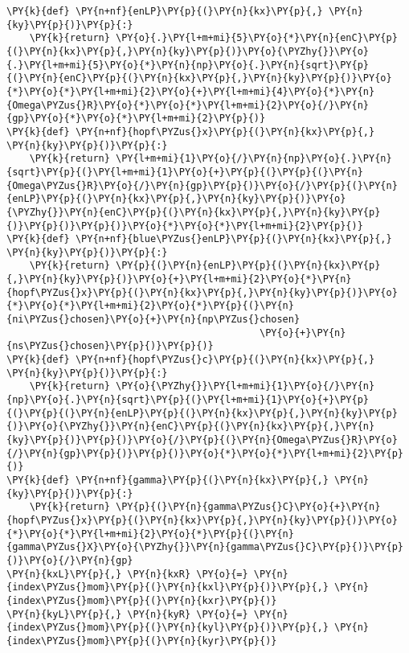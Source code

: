 \begin{Verbatim}[commandchars=\\\{\}]
\PY{k}{def} \PY{n+nf}{enLP}\PY{p}{(}\PY{n}{kx}\PY{p}{,} \PY{n}{ky}\PY{p}{)}\PY{p}{:}
    \PY{k}{return} \PY{o}{.}\PY{l+m+mi}{5}\PY{o}{*}\PY{n}{enC}\PY{p}{(}\PY{n}{kx}\PY{p}{,}\PY{n}{ky}\PY{p}{)}\PY{o}{\PYZhy{}}\PY{o}{.}\PY{l+m+mi}{5}\PY{o}{*}\PY{n}{np}\PY{o}{.}\PY{n}{sqrt}\PY{p}{(}\PY{n}{enC}\PY{p}{(}\PY{n}{kx}\PY{p}{,}\PY{n}{ky}\PY{p}{)}\PY{o}{*}\PY{o}{*}\PY{l+m+mi}{2}\PY{o}{+}\PY{l+m+mi}{4}\PY{o}{*}\PY{n}{Omega\PYZus{}R}\PY{o}{*}\PY{o}{*}\PY{l+m+mi}{2}\PY{o}{/}\PY{n}{gp}\PY{o}{*}\PY{o}{*}\PY{l+m+mi}{2}\PY{p}{)}
\PY{k}{def} \PY{n+nf}{hopf\PYZus{}x}\PY{p}{(}\PY{n}{kx}\PY{p}{,} \PY{n}{ky}\PY{p}{)}\PY{p}{:}
    \PY{k}{return} \PY{l+m+mi}{1}\PY{o}{/}\PY{n}{np}\PY{o}{.}\PY{n}{sqrt}\PY{p}{(}\PY{l+m+mi}{1}\PY{o}{+}\PY{p}{(}\PY{p}{(}\PY{n}{Omega\PYZus{}R}\PY{o}{/}\PY{n}{gp}\PY{p}{)}\PY{o}{/}\PY{p}{(}\PY{n}{enLP}\PY{p}{(}\PY{n}{kx}\PY{p}{,}\PY{n}{ky}\PY{p}{)}\PY{o}{\PYZhy{}}\PY{n}{enC}\PY{p}{(}\PY{n}{kx}\PY{p}{,}\PY{n}{ky}\PY{p}{)}\PY{p}{)}\PY{p}{)}\PY{o}{*}\PY{o}{*}\PY{l+m+mi}{2}\PY{p}{)}
\PY{k}{def} \PY{n+nf}{blue\PYZus{}enLP}\PY{p}{(}\PY{n}{kx}\PY{p}{,} \PY{n}{ky}\PY{p}{)}\PY{p}{:}
    \PY{k}{return} \PY{p}{(}\PY{n}{enLP}\PY{p}{(}\PY{n}{kx}\PY{p}{,}\PY{n}{ky}\PY{p}{)}\PY{o}{+}\PY{l+m+mi}{2}\PY{o}{*}\PY{n}{hopf\PYZus{}x}\PY{p}{(}\PY{n}{kx}\PY{p}{,}\PY{n}{ky}\PY{p}{)}\PY{o}{*}\PY{o}{*}\PY{l+m+mi}{2}\PY{o}{*}\PY{p}{(}\PY{n}{ni\PYZus{}chosen}\PY{o}{+}\PY{n}{np\PYZus{}chosen}
                                            \PY{o}{+}\PY{n}{ns\PYZus{}chosen}\PY{p}{)}\PY{p}{)}
\PY{k}{def} \PY{n+nf}{hopf\PYZus{}c}\PY{p}{(}\PY{n}{kx}\PY{p}{,} \PY{n}{ky}\PY{p}{)}\PY{p}{:}
    \PY{k}{return} \PY{o}{\PYZhy{}}\PY{l+m+mi}{1}\PY{o}{/}\PY{n}{np}\PY{o}{.}\PY{n}{sqrt}\PY{p}{(}\PY{l+m+mi}{1}\PY{o}{+}\PY{p}{(}\PY{p}{(}\PY{n}{enLP}\PY{p}{(}\PY{n}{kx}\PY{p}{,}\PY{n}{ky}\PY{p}{)}\PY{o}{\PYZhy{}}\PY{n}{enC}\PY{p}{(}\PY{n}{kx}\PY{p}{,}\PY{n}{ky}\PY{p}{)}\PY{p}{)}\PY{o}{/}\PY{p}{(}\PY{n}{Omega\PYZus{}R}\PY{o}{/}\PY{n}{gp}\PY{p}{)}\PY{p}{)}\PY{o}{*}\PY{o}{*}\PY{l+m+mi}{2}\PY{p}{)}
\PY{k}{def} \PY{n+nf}{gamma}\PY{p}{(}\PY{n}{kx}\PY{p}{,} \PY{n}{ky}\PY{p}{)}\PY{p}{:}
    \PY{k}{return} \PY{p}{(}\PY{n}{gamma\PYZus{}C}\PY{o}{+}\PY{n}{hopf\PYZus{}x}\PY{p}{(}\PY{n}{kx}\PY{p}{,}\PY{n}{ky}\PY{p}{)}\PY{o}{*}\PY{o}{*}\PY{l+m+mi}{2}\PY{o}{*}\PY{p}{(}\PY{n}{gamma\PYZus{}X}\PY{o}{\PYZhy{}}\PY{n}{gamma\PYZus{}C}\PY{p}{)}\PY{p}{)}\PY{o}{/}\PY{n}{gp}
\PY{n}{kxL}\PY{p}{,} \PY{n}{kxR} \PY{o}{=} \PY{n}{index\PYZus{}mom}\PY{p}{(}\PY{n}{kxl}\PY{p}{)}\PY{p}{,} \PY{n}{index\PYZus{}mom}\PY{p}{(}\PY{n}{kxr}\PY{p}{)}
\PY{n}{kyL}\PY{p}{,} \PY{n}{kyR} \PY{o}{=} \PY{n}{index\PYZus{}mom}\PY{p}{(}\PY{n}{kyl}\PY{p}{)}\PY{p}{,} \PY{n}{index\PYZus{}mom}\PY{p}{(}\PY{n}{kyr}\PY{p}{)}

\end{Verbatim}
